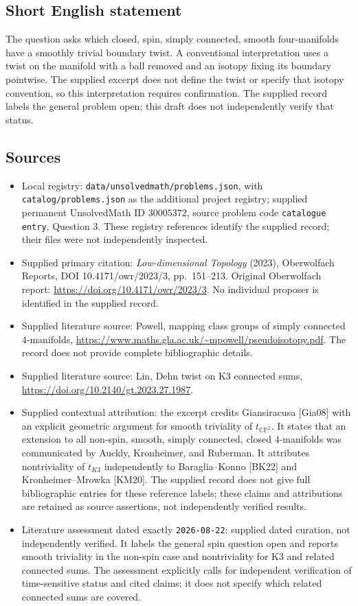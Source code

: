 \documentclass[11pt]{article}
\begin{document}
\subsection{Short English statement}
The question asks which closed, spin, simply connected, smooth four-manifolds have a smoothly trivial boundary twist. A conventional interpretation uses a twist on the manifold with a ball removed and an isotopy fixing its boundary pointwise. The supplied excerpt does not define the twist or specify that isotopy convention, so this interpretation requires confirmation. The supplied record labels the general problem open; this draft does not independently verify that status.
\subsection{Sources}
\begin{itemize}
\item Local registry: \texttt{data/unsolvedmath/problems.json}, with \texttt{catalog/problems.json} as the additional project registry; supplied permanent UnsolvedMath ID \(30005372\), source problem code \texttt{catalogue entry}, Question 3. These registry references identify the supplied record; their files were not independently inspected.
\item Supplied primary citation: \emph{Low-dimensional Topology} (2023), Oberwolfach Reports, DOI 10.4171/owr/2023/3, pp.\ 151--213. Original Oberwolfach report: \url{https://doi.org/10.4171/owr/2023/3}. No individual proposer is identified in the supplied record.
\item Supplied literature source: Powell, mapping class groups of simply connected \(4\)-manifolds, \url{https://www.maths.gla.ac.uk/~mpowell/pseudoisotopy.pdf}. The record does not provide complete bibliographic details.
\item Supplied literature source: Lin, Dehn twist on K3 connected sums, \url{https://doi.org/10.2140/gt.2023.27.1987}.
\item Supplied contextual attribution: the excerpt credits Giansiracusa [Gia08] with an explicit geometric argument for smooth triviality of \(t_{\mathbb{CP}^2}\). It states that an extension to all non-spin, smooth, simply connected, closed \(4\)-manifolds was communicated by Auckly, Kronheimer, and Ruberman. It attributes nontriviality of \(t_{K3}\) independently to Baraglia--Konno [BK22] and Kronheimer--Mrowka [KM20]. The supplied record does not give full bibliographic entries for these reference labels; these claims and attributions are retained as source assertions, not independently verified results.
\item Literature assessment dated exactly \texttt{2026-08-22}: supplied dated curation, not independently verified. It labels the general spin question open and reports smooth triviality in the non-spin case and nontriviality for K3 and related connected sums. The assessment explicitly calls for independent verification of time-sensitive status and cited claims; it does not specify which related connected sums are covered.
\end{itemize}
\end{document}
